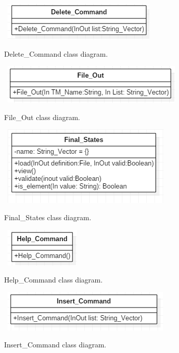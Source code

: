 \documentclass{report}
\begin{document}
\begin{figure}[!ht]
  	\centering
	\
    \includegraphics[scale=0.90]{Delete_Command.png}
  \caption{Delete\_Command class diagram.}
\end{figure}

\begin{figure}[!ht]
  	\centering
	\
    \includegraphics[scale=0.90]{File_Out.png}
  \caption{File\_Out class diagram.}
\end{figure}

\begin{figure}[!ht]
  	\centering
	\
    \includegraphics[scale=0.90]{Final_States.png}
  \caption{Final\_States class diagram.}
\end{figure}

\begin{figure}[!ht]
  	\centering
	\
    \includegraphics[scale=0.90]{Help_Command.png}
  \caption{Help\_Command class diagram.}
\end{figure}


\begin{figure}[!ht]
  	\centering
	\
    \includegraphics[scale=0.90]{Insert_Command.png}
  \caption{Insert\_Command class diagram.}
\end{figure}
\end{document}
